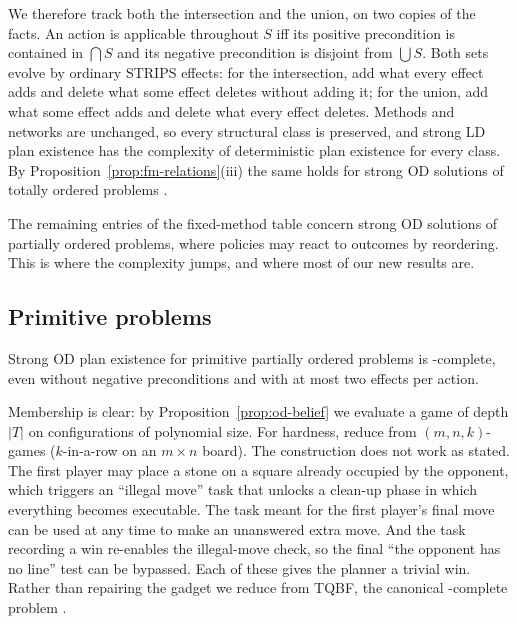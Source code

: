 We therefore track both the intersection and the union, on two copies of the facts. An action is
applicable throughout $S$ iff its positive precondition is contained in $\bigcap S$ and its
negative precondition is disjoint from $\bigcup S$. Both sets evolve by ordinary STRIPS effects:
for the intersection, add what every effect adds and delete what some effect deletes without
adding it; for the union, add what some effect adds and delete what every effect deletes. Methods
and networks are unchanged, so every structural class is preserved, and strong LD plan existence
has the complexity of deterministic plan existence for every class. By
Proposition~\ref{prop:fm-relations}(iii) the same holds for strong OD solutions of totally ordered
problems \parencite[Cor.~4.8]{chen:bercher:icaps-21}.

The remaining entries of the fixed-method table concern strong OD solutions of partially ordered
problems, where policies may react to outcomes by reordering. This is where the complexity jumps,
and where most of our new results are.

\subsection{Primitive problems}

\begin{theorem}\label{thm:prim-po}
  Strong OD plan existence for primitive partially ordered problems is \PSPACE-complete, even
  without negative preconditions and with at most two effects per action.
\end{theorem}

Membership is clear: by Proposition~\ref{prop:od-belief} we evaluate a game of depth $|T|$ on
configurations of polynomial size. For hardness, \CBa{} reduce from $(m,n,k)$-games
($k$-in-a-row on an $m\times n$ board). The construction does not work as stated. The first player
may place a stone on a square already occupied by the opponent, which triggers an ``illegal move''
task that unlocks a clean-up phase in which everything becomes executable. The task meant for the
first player's final move can be used at any time to make an unanswered extra move. And the task
recording a win re-enables the illegal-move check, so the final ``the opponent has no line'' test
can be bypassed. Each of these gives the planner a trivial win. Rather than repairing the gadget
we reduce from TQBF, the canonical \PSPACE-complete problem \parencite{stockmeyer:meyer:stoc-73}.

